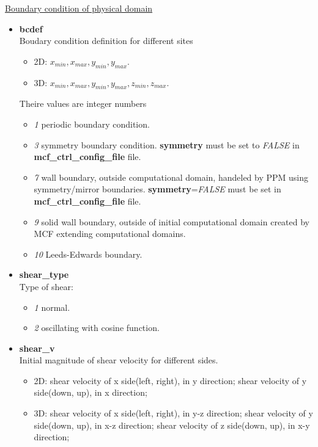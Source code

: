 \documentclass[a4paper,10pt]{article}
\begin{document}
\begin{center}
\underline{\textlangle Boundary condition of physical domain \textrangle}
\end{center}

\begin{itemize}

\item  
\textbf{bcdef} \\
Boudary condition definition for different sites
\begin{itemize}
 \item 2D: 
  \textit{$x_{min}, x_{max}, y_{min}, y_{max}$}.
 \item 3D:
  \textit{$x_{min}, x_{max}, y_{min}, y_{max}, z_{min}, z_{max}$}.
\end{itemize}
Theire values are integer numbers
\begin{itemize}
 \item  \textit{1} 
periodic boundary condition.
 \item  \textit{3}
symmetry boundary condition.
\textbf{symmetry} must be set to \textit{FALSE}
in \textbf{mcf\_ctrl\_config\_file} file.
\item \textit{7}
wall boundary, outside computational domain,
handeled by PPM using symmetry/mirror boundaries.
\textbf{symmetry}=\textit{FALSE} must be set
in \textbf{mcf\_ctrl\_config\_file} file.
\item  \textit{9}
solid wall boundary, outside of initial computational 
domain created by MCF extending computational domains.
 \item \textit{10} 
 Leeds-Edwards boundary.
\end{itemize}

\item 
\textbf{shear\_type} \\
Type of shear:
\begin{itemize}
\item \textit{1} normal.
\item \textit{2} oscillating with cosine function.
\end{itemize}

\item 
\textbf{shear\_v} \\
Initial magnitude of shear velocity for different sides.
\begin{itemize}
\item 2D: shear velocity of x side(left, right), in y direction;
shear velocity of y side(down, up), in x direction;
\item 3D: shear velocity of x side(left, right), in y-z direction;
shear velocity of y side(down, up), in x-z direction;
shear velocity of z side(down, up), in x-y direction;
\end{itemize}


\end{itemize}
\end{document}
